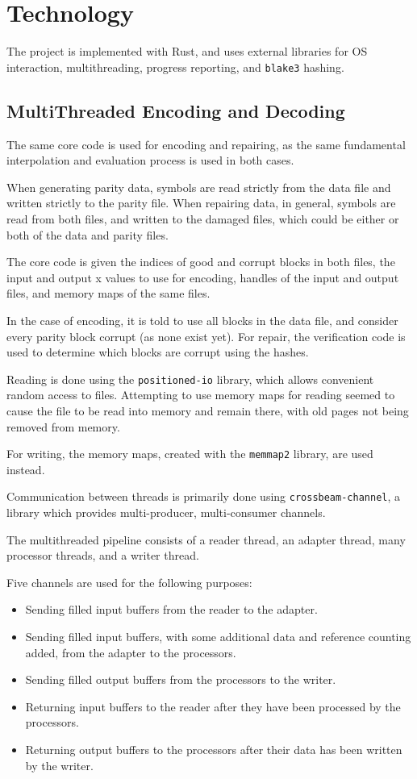 \chapter{Technology}

The project is implemented with Rust, and uses external libraries for OS interaction, multithreading, progress reporting, and \texttt{blake3} hashing.

\section{MultiThreaded Encoding and Decoding}

The same core code is used for encoding and repairing, as the same fundamental interpolation and evaluation process is used in both cases.

When generating parity data, symbols are read strictly from the data file and written strictly to the parity file.
When repairing data, in general, symbols are read from both files, and written to the damaged files, which could be either or both of the data and parity files.

The core code is given the indices of good and corrupt blocks in both files, the input and output x values to use for encoding,
handles of the input and output files, and memory maps of the same files.

In the case of encoding, it is told to use all blocks in the data file, and consider every parity block corrupt (as none exist yet).
For repair, the verification code is used to determine which blocks are corrupt using the hashes.

Reading is done using the \texttt{positioned-io} library, which allows convenient random access to files.
Attempting to use memory maps for reading seemed to cause the file to be read into memory and remain there, with old pages not being removed from memory.

For writing, the memory maps, created with the \texttt{memmap2} library, are used instead.

Communication between threads is primarily done using \texttt{crossbeam-channel}, a library which provides multi-producer, multi-consumer channels.

The multithreaded pipeline consists of a reader thread, an adapter thread, many processor threads, and a writer thread.

Five channels are used for the following purposes:
\begin{itemize}
    \item Sending filled input buffers from the reader to the adapter.
    \item Sending filled input buffers, with some additional data and reference counting added, from the adapter to the processors.
    \item Sending filled output buffers from the processors to the writer.
    \item Returning input buffers to the reader after they have been processed by the processors.
    \item Returning output buffers to the processors after their data has been written by the writer.
\end{itemize}

